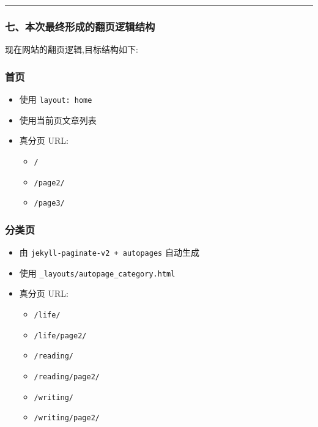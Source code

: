 \documentclass[lang=cn,scheme=chinese,color=blue,device=normal,toc=onecol,math=cm]{elegantbook}
\begin{document}
\medskip\hrule\medskip


\subsubsection{七、本次最终形成的翻页逻辑结构}


现在网站的翻页逻辑,目标结构如下:\par


\subsubsection{首页}


\begin{itemize}
\item 使用 \texttt{layout: home}
\item 使用当前页文章列表
\item 真分页 URL: 
\begin{itemize}
\item \texttt{/\allowbreak{}}
\item \texttt{/\allowbreak{}page2/\allowbreak{}}
\item \texttt{/\allowbreak{}page3/\allowbreak{}}
\end{itemize}
\end{itemize}


\subsubsection{分类页}


\begin{itemize}
\item 由 \texttt{jekyll-paginate-v2 + autopages} 自动生成
\item 使用 \texttt{\_\allowbreak{}layouts/\allowbreak{}autopage\_\allowbreak{}category.html}
\item 真分页 URL: 
\begin{itemize}
\item \texttt{/\allowbreak{}life/\allowbreak{}}
\item \texttt{/\allowbreak{}life/\allowbreak{}page2/\allowbreak{}}
\item \texttt{/\allowbreak{}reading/\allowbreak{}}
\item \texttt{/\allowbreak{}reading/\allowbreak{}page2/\allowbreak{}}
\item \texttt{/\allowbreak{}writing/\allowbreak{}}
\item \texttt{/\allowbreak{}writing/\allowbreak{}page2/\allowbreak{}}
\end{itemize}
\end{itemize}
\end{document}
